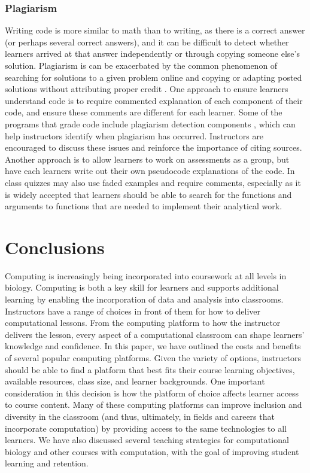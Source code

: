 \subsubsection{Plagiarism}
Writing code is more similar to math than to writing, as there is a correct answer (or perhaps several correct answers), and it can be difficult to detect whether learners arrived at that answer independently or through copying someone else's solution.
Plagiarism is can be exacerbated by the common phenomenon of searching for solutions to a given problem online and copying or adapting posted solutions without attributing proper credit \citep{gaspar_restoring_2007}. 
One approach to ensure learners understand code is to require commented explanation of each component of their code, and ensure these comments are different for each learner.
Some of the programs that grade code include plagiarism detection components \citep{pears_survey_2007}, which can help instructors identify when plagiarism has occurred.
Instructors are encouraged to discuss these issues and reinforce the importance of citing sources.
Another approach is to allow learners to work on assessments as a group, but have each learners write out their own pseudocode explanations of the code.
In class quizzes may also use faded examples and require comments,
especially as it is widely accepted that learners should be able to search for the functions
and arguments to functions that are needed to implement their analytical work.

\section{Conclusions}

Computing is increasingly being incorporated into coursework at all levels in biology.
Computing is both a key skill for learners and supports additional learning by enabling the incorporation of data and analysis into classrooms. 
Instructors have a range of choices in front of them for how to deliver computational lessons.
From the computing platform to how the instructor delivers the lesson, every aspect of a computational classroom can shape learners' knowledge and confidence. 
In this paper, we have outlined the costs and benefits of several popular computing platforms.
Given the variety of options, instructors should be able to find a platform that best fits their course learning objectives, available resources, class size, and learner backgrounds.
One important consideration in this decision is how the platform of choice affects learner access to course content.
Many of these computing platforms can improve inclusion and diversity in the classroom (and thus, ultimately, in fields and careers that incorporate computation) by providing access to the same technologies to all learners.
We have also discussed several teaching strategies for computational biology and other courses with computation, with the goal of improving student learning and retention.

